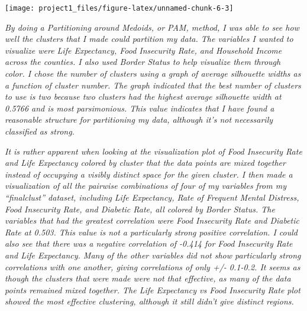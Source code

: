 \documentclass[]{article}
\begin{document}
\begin{center}\texttt{[image: project1\_files/figure-latex/unnamed-chunk-6-3]} \end{center}

\emph{By doing a Partitioning around Medoids, or PAM, method, I was able
to see how well the clusters that I made could partition my data. The
variables I wanted to visualize were Life Expectancy, Food Insecurity
Rate, and Household Income across the counties. I also used Border
Status to help visualize them through color. I chose the number of
clusters using a graph of average silhouette widths as a function of
cluster number. The graph indicated that the best number of clusters to
use is two because two clusters had the highest average silhouette width
at 0.5766 and is most parsimonious. This value indicates that I have
found a reasonable structure for partitioning my data, although it's not
necessarily classified as strong.}

\emph{It is rather apparent when looking at the visualization plot of
Food Insecurity Rate and Life Expectancy colored by cluster that the
data points are mixed together instead of occupying a visibly distinct
space for the given cluster. I then made a visualization of all the
pairwise combinations of four of my variables from my ``finalclust''
dataset, including Life Expectancy, Rate of Frequent Mental Distress,
Food Insecurity Rate, and Diabetic Rate, all colored by Border Status.
The variables that had the greatest correlation were Food Insecurity
Rate and Diabetic Rate at 0.503. This value is not a particularly strong
positive correlation. I could also see that there was a negative
correlation of -0.414 for Food Insecurity Rate and Life Expectancy. Many
of the other variables did not show particularly strong correlations
with one another, giving correlations of only +/- 0.1-0.2. It seems as
though the clusters that were made were not that effective, as many of
the data points remained mixed together. The Life Expectancy vs Food
Insecurity Rate plot showed the most effective clustering, although it
still didn't give distinct regions.}
\end{document}
